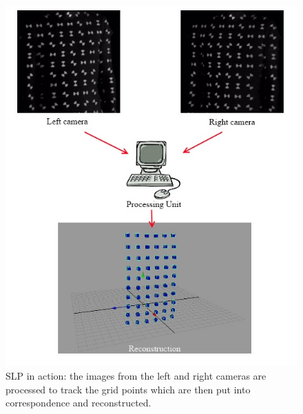 \begin{figure}
	\centering
	 \includegraphics[scale=0.7]{pics/slp_reconstruction}
	\caption[SLP in action]{\label{fig:slp_reconstruction}SLP in action: the images from the left and right cameras are processed to track the grid points which are then put into correspondence and reconstructed.}
\end{figure}

